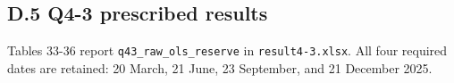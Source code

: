 \endgroup

\subsection*{D.5 Q4-3 prescribed results}\label{d.5-q4-3-prescribed-results}

Tables 33-36 report \nolinkurl{q43_raw_ols_reserve} in \nolinkurl{result4-3.xlsx}. All four required dates are retained: 20 March, 21 June, 23 September, and 21 December 2025.

\Needspace{97.9pt}
\begingroup
\fontsize{8.3}{9.96}\selectfont
\setlength{\tabcolsep}{3.2pt}
\renewcommand{\arraystretch}{1.12}
\setlength{\LTleft}{0pt plus 1fill}\setlength{\LTright}{0pt plus 1fill}
\setlength{\LTcapwidth}{\linewidth}

